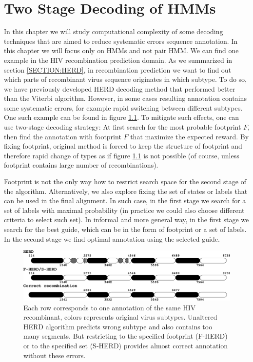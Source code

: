 \chapter{Two Stage Decoding of HMMs}

In this chapter we will study computational complexity of some decoding
techniques that are aimed to reduce systematic errors sequence annotation. In
this chapter we will focus only on HMMs and not pair HMM. We can find one
example in the HIV recombination prediction domain. As we summarized in section
\ref{SECTION:HERD}, in recombination prediction we want to  find out which parts
of recombinant virus sequence originates in which subtype.  To do so, we have
previously developed HERD decoding method \cite{Nanasi2010, Nanasi2010mgr} that
performed better than the Viterbi algorithm. However, in some cases resulting
annotation contains some systematic errors, for example rapid switching between
different subtypes. One such example can be found in figure
\ref{FIGURE:HERD_BAD}.  To mitigate such effects, one can use two-stage decoding
strategy: At first search for the most probable footprint $F$, then find the
annotation with footprint $F$ that maximize the expected reward. By fixing
footprint, original method is forced to keep the structure of footprint and
therefore rapid change of types as if figure \ref{FIGURE:HERD_BAD} is not
possible (of course, unless footprint contains large number of recombinations).

Footprint is not the only way how to restrict search space for the second stage
of the algorithm. Alternatively, we also explore fixing the set of states or
labels that can be used in the final alignment. In such case, in the first stage
we search for a set of labels with maximal probability (in practice we could
also choose different criteria to select such set). In informal and more general
way, in the first stage we search for the best guide, which can be in the form
of footprint or a set of labels. In the second stage we find optimal
annotation using the selected guide.

\begin{figure}
\begin{center}
\includegraphics[width=14cm]{../figures/jcss/happyStory.pdf}
\end{center}
\caption[Example of annotation with systematic error.]{ 
Each row corresponds to one annotation of the same HIV recombinant, colors
represents original virus subtypes. Unaltered HERD algorithm predicts wrong
subtype and also contains too many segments. But restricting to the specified
footprint (F-HERD) or to the specified set (S-HERD) provides almost correct
annotation without these errors.  }\label{FIGURE:HERD_BAD} 
\end{figure}

